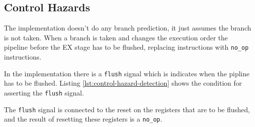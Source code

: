 \subsection{Control Hazards}
The implementation doesn't do any branch prediction, it just assumes the branch is not taken.
When a branch is taken and changes the execution order the pipeline before the EX stage has to be flushed,
replacing instructions with \texttt{no\_op} instructions.

In the implementation there is a \texttt{flush} signal which is indicates when the pipline has to be flushed.
Listing \ref{lst:control-hazard-detection} shows the condition for asserting the \texttt{flush} signal.


The \texttt{flush} signal is connected to the reset on the registers that are to be flushed,
and the result of resetting these registers is a \texttt{no\_op}.

